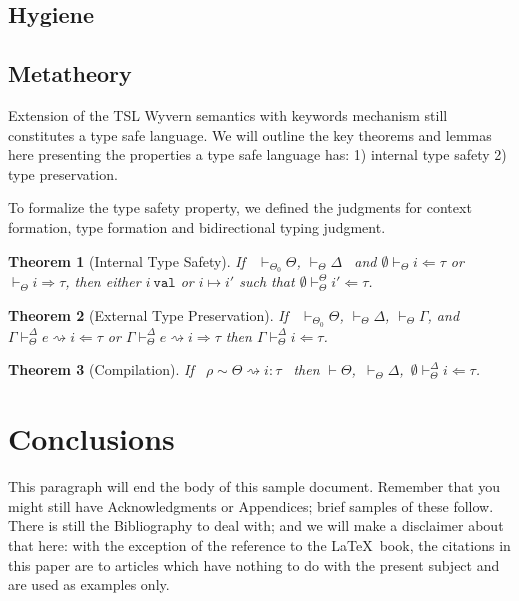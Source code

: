 \documentclass{sig-alternate}
\newcommand{\myvdash}{\vdash_{\Theta}^{\Delta}}
\newtheorem{theorem}{Theorem}
\begin{document}
\subsection{Hygiene}

\subsection{Metatheory}
Extension of the TSL Wyvern semantics with keywords mechanism still constitutes a type safe language. We will outline the key theorems and lemmas here presenting the properties a type safe language has: 1) internal type safety 2) type preservation. 

To formalize the type safety property, we defined the judgments for context formation, type formation and bidirectional typing judgment. 

\begin{theorem}[Internal Type Safety]
If ~$\vdash_{\Theta_0}\Theta$, $\vdash_{\Theta}\Delta$~ and $\emptyset\vdash_{\Theta}i\Leftarrow\tau$ or $\vdash_{\Theta}i\Rightarrow\tau$, then either $i~\texttt{val}$ or $i\mapsto i'$ such that $\emptyset\vdash^{\Theta}_{\Theta}i'\Leftarrow\tau$.
\end{theorem}

\begin{theorem}[External Type Preservation]
If ~$\vdash_{\Theta_0}\Theta$, $\vdash_{\Theta}\Delta$, $\vdash_{\Theta}\Gamma$, and $\Gamma\myvdash e\rightsquigarrow i\Leftarrow\tau$ or $\Gamma\myvdash e\rightsquigarrow i\Rightarrow\tau$ then $\Gamma\myvdash i\Leftarrow\tau$.
\end{theorem}

\begin{theorem}[Compilation]
If ~$\rho\sim\Theta\rightsquigarrow i:\tau$~ then $\vdash\Theta$,~$\vdash_{\Theta}\Delta$,~$\emptyset\myvdash i\Leftarrow\tau$.
\end{theorem}

%



\section{Conclusions}
This paragraph will end the body of this sample document.
Remember that you might still have Acknowledgments or
Appendices; brief samples of these
follow.  There is still the Bibliography to deal with; and
we will make a disclaimer about that here: with the exception
of the reference to the \LaTeX\ book, the citations in
this paper are to articles which have nothing to
do with the present subject and are used as
examples only.
\end{document}
